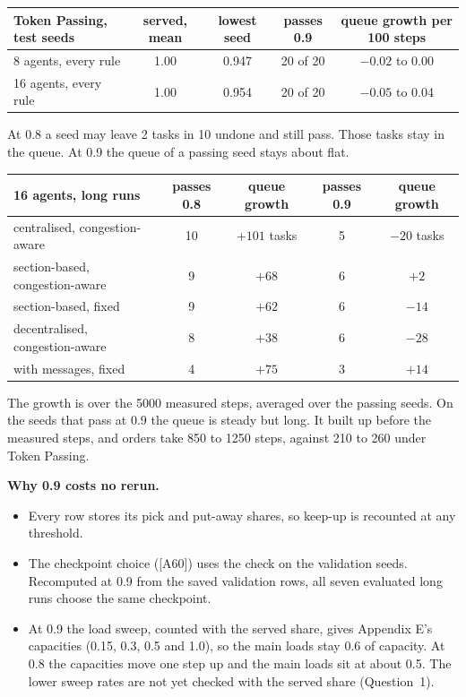 \documentclass[11pt,a4paper]{article}
\begin{document}
\begin{table}[H]\centering\small
\begin{tabular}{lcccc}
\toprule
Token Passing, test seeds & served, mean & lowest seed & passes 0.9 & queue growth per 100 steps\\
\midrule
8 agents, every rule & 1.00 & 0.947 & 20 of 20 & $-0.02$ to 0.00\\
16 agents, every rule & 1.00 & 0.954 & 20 of 20 & $-0.05$ to 0.04\\
\bottomrule
\end{tabular}
\end{table}

At 0.8 a seed may leave 2 tasks in 10 undone and still pass. Those tasks
stay in the queue. At 0.9 the queue of a passing seed stays about flat.

\begin{table}[H]\centering\small
\begin{tabular}{lcccc}
\toprule
16 agents, long runs & passes 0.8 & queue growth & passes 0.9 & queue growth\\
\midrule
centralised, congestion-aware & 10 & $+101$ tasks & 5 & $-20$ tasks\\
section-based, congestion-aware & 9 & $+68$ & 6 & $+2$\\
section-based, fixed & 9 & $+62$ & 6 & $-14$\\
decentralised, congestion-aware & 8 & $+38$ & 6 & $-28$\\
with messages, fixed & 4 & $+75$ & 3 & $+14$\\
\bottomrule
\end{tabular}
\end{table}

The growth is over the 5000 measured steps, averaged over the passing seeds.
On the seeds that pass at 0.9 the queue is steady but long. It built up
before the measured steps, and orders take 850 to 1250 steps, against 210
to 260 under Token Passing.

\textbf{Why 0.9 costs no rerun.}
\begin{itemize}[leftmargin=1.2em]
\item Every row stores its pick and put-away shares, so keep-up is recounted
  at any threshold.
\item The checkpoint choice ([A60]) uses the check on the validation seeds.
  Recomputed at 0.9 from the saved validation rows, all seven evaluated long
  runs choose the same checkpoint.
\item At 0.9 the load sweep, counted with the served share, gives Appendix
  E's capacities (0.15, 0.3, 0.5 and 1.0), so the main loads stay 0.6 of
  capacity. At 0.8 the capacities move one step up and the main loads sit at
  about 0.5. The lower sweep rates are not yet checked with the served
  share (Question~1).
\end{itemize}
\end{document}
